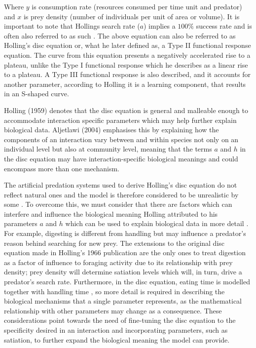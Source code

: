 \documentclass[11pt]{article}
\begin{document}
  Where $y$ is consumption rate (resources consumed per time unit and predator) and $x$ is prey density (number of individuals per unit of area or volume). It is important to note that Hollings search rate ($a$) implies a $100\%$ success rate  and is often also referred to as such \cite{Holling1959}. The above equation can also be referred to as Holling’s disc equation or, what he later defined as, a Type II functional response equation. The curve from this equation presents a negatively accelerated rise to a plateau, unlike the Type I functional response which he describes as a linear rise to a plateau. A Type III functional response is also described, and it accounts for another parameter, according to Holling it is a learning component, that results in an S-shaped curve. 
  
  Holling (1959) \cite{Holling1959} denotes that the disc equation is general and malleable enough to accommodate interaction specific parameters which may help further explain biological data. Aljetlawi (2004) \cite{Aljetlawi2004} emphasises this by explaining how the components of an interaction vary between and within species not only on an individual level but also at community level, meaning that the terms $a$ and $h$ in the disc equation may have interaction-specific biological meanings and could encompass more than one mechanism.
  
  The artificial predation systems used to derive Holling’s disc equation do not reflect natural ones and the model is therefore considered to be unrealistic by some \cite{Jeschke2002}. To overcome this, we must consider that there are factors which can interfere and influence the biological meaning Holling attributed to his parameters $a$ and $h$ which can be used to explain biological data in more detail \cite{Aljetlawi2004}. For example, digesting is different from handling but may influence a predator's reason behind searching for new prey. The extensions to the original disc equation made in Holling's 1966 publication \cite{Holling1966} are the only ones to treat digestion as a factor of influence to foraging activity due to its relationship with prey density; prey density will determine satiation levels which will, in turn, drive a predator’s search rate. Furthermore, in the disc equation, eating time is modelled together with handling time \cite{Jeschke2002}, so more detail is required in describing the biological mechanisms that a single parameter represents, as the mathematical relationship with other parameters may change as a consequence. These considerations point towards the need of fine-tuning the disc equation to the specificity desired in an interaction and incorporating parameters, such as satiation, to further expand the biological meaning the model can provide. 
  
\end{document}
